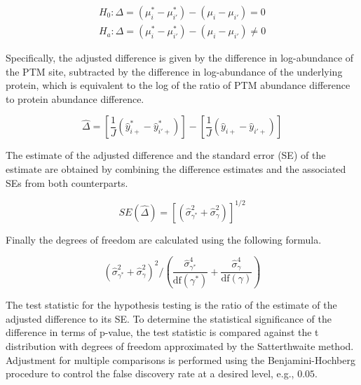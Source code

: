 \documentclass[mcp]{article}
\numberwithin{figure}{section} %
\numberwithin{table}{section}
\begin{document}
\begin{equation}
\begin{aligned}
H_{0}: \Delta = ( \mu_{i}^{\ast} - \mu_{i'}^{\ast} ) - ( \mu_{i} - \mu_{i'} ) = 0 \\
H_{a}: \Delta = ( \mu_{i}^{\ast} - \mu_{i'}^{\ast} ) - ( \mu_{i} - \mu_{i'} ) \neq 0
\end{aligned}
\end{equation}

Specifically, the adjusted difference is given by the difference in log-abundance of the PTM site, subtracted by the difference in log-abundance of the underlying protein, which is equivalent to the log of the ratio of PTM abundance difference to protein abundance difference. 

\begin{equation}
\hat{\Delta} = \left[ \frac{1}{J} \left( \hat{y}_{i+}^{\ast} - \hat{y}_{i'+}^{\ast} \right) \right] - \left[ \frac{1}{J} \left( \hat{y}_{i+} - \hat{y}_{i'+} \right) \right]
\end{equation}

The estimate of the adjusted difference and the standard error (SE) of the estimate are obtained by combining the difference estimates and the associated SEs from both counterparts.

\begin{equation}
SE(\hat{\Delta}) = \left[ \left( \hat{\sigma}_{\gamma^{\ast}}^{2} + \hat{\sigma}_{\gamma}^{2} \right) \right]^{1/2}
\end{equation}

Finally the degrees of freedom are calculated using the following formula.

\begin{equation}
\left( \hat{\sigma}_{\gamma^{\ast}}^{2} + \hat{\sigma}_{\gamma}^{2} \right)^2 \bigg/
\left( \frac{\hat{\sigma}_{\gamma^{\ast}}^{4}}{\mathrm{df}(\gamma^{\ast})} + \frac{\hat{\sigma}_{\gamma}^{4}}{ \mathrm{df}(\gamma)} \right)
\end{equation}

The test statistic for the hypothesis testing is the ratio of the estimate of the adjusted difference to its SE. To determine the statistical significance of the difference in terms of p-value, the test statistic is compared against the t distribution with degrees of freedom approximated by the Satterthwaite method\cite{satterthwaite:1946}. Adjustment for multiple comparisons is performed using the Benjamini-Hochberg procedure to control the false discovery rate at a desired level, e.g., $0.05$\cite{Benjamini:1995}.
\end{document}
